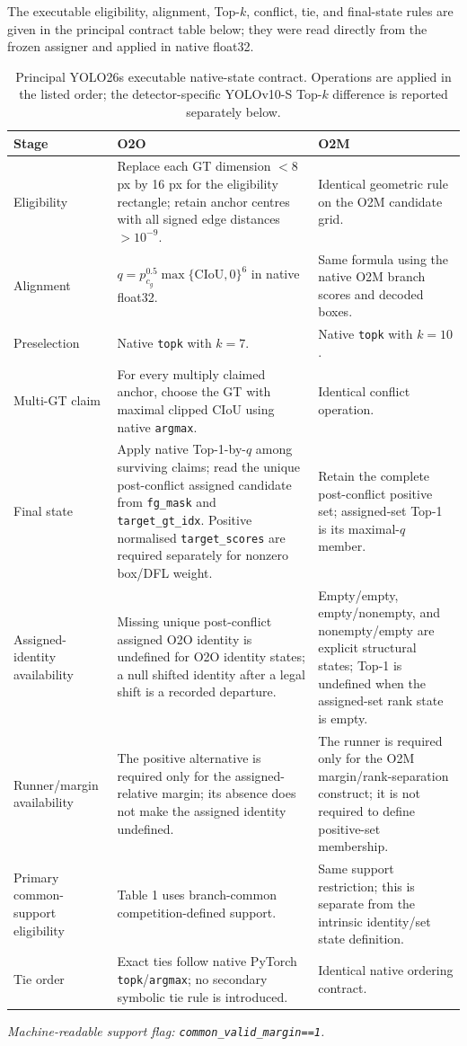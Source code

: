\documentclass[preprint,10pt]{elsarticle}
\begin{document}
The executable eligibility, alignment, Top-$k$, conflict, tie, and final-state rules are given in the principal contract table below; they were read directly from the frozen assigner and applied in native float32.

\begin{table}[ht]
\centering
\caption{Principal YOLO26s executable native-state contract. Operations are applied in the listed order; the detector-specific YOLOv10-S Top-$k$ difference is reported separately below.}
\begin{tabularx}{\textwidth}{@{}p{}XX@{}}
\toprule
Stage & O2O & O2M \\
\midrule
Eligibility & Replace each GT dimension $<8$ px by 16 px for the eligibility rectangle; retain anchor centres with all signed edge distances $>10^{-9}$. & Identical geometric rule on the O2M candidate grid. \\
Alignment & $q=p_{c_g}^{0.5}\max\{\mathrm{CIoU},0\}^{6}$ in native float32. & Same formula using the native O2M branch scores and decoded boxes. \\
Preselection & Native \texttt{topk} with $k=7$. & Native \texttt{topk} with $k=10$. \\
Multi-GT claim & For every multiply claimed anchor, choose the GT with maximal clipped CIoU using native \texttt{argmax}. & Identical conflict operation. \\
Final state & Apply native Top-1-by-$q$ among surviving claims; read the unique post-conflict assigned candidate from \texttt{fg\_mask} and \texttt{target\_gt\_idx}. Positive normalised \texttt{target\_scores} are required separately for nonzero box/DFL weight. & Retain the complete post-conflict positive set; assigned-set Top-1 is its maximal-$q$ member. \\
Assigned-identity availability & Missing unique post-conflict assigned O2O identity is undefined for O2O identity states; a null shifted identity after a legal shift is a recorded departure. & Empty/empty, empty/nonempty, and nonempty/empty are explicit structural states; Top-1 is undefined when the assigned-set rank state is empty. \\
Runner/margin availability & The positive alternative is required only for the assigned-relative margin; its absence does not make the assigned identity undefined. & The runner is required only for the O2M margin/rank-separation construct; it is not required to define positive-set membership. \\
Primary common-support eligibility & Table 1 uses branch-common competition-defined support. & Same support restriction; this is separate from the intrinsic identity/set state definition. \\
Tie order & Exact ties follow native PyTorch \texttt{topk}/\texttt{argmax}; no secondary symbolic tie rule is introduced. & Identical native ordering contract. \\
\bottomrule
\end{tabularx}
\end{table}
\smallskip
\noindent\textit{Machine-readable support flag: \texttt{common\_valid\_margin==1}.}
\end{document}
